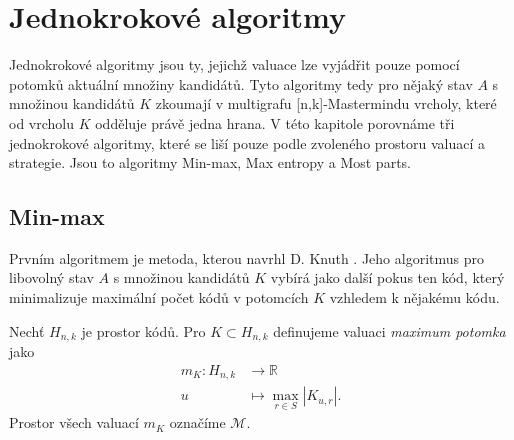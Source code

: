 
\chapter{Jednokrokové algoritmy}
Jednokrokové algoritmy jsou ty, jejichž valuace lze vyjádřit pouze pomocí potomků aktuální množiny kandidátů. Tyto algoritmy tedy pro nějaký stav $A$ s množinou kandidátů $K$ zkoumají v multigrafu [n,k]-Mastermindu vrcholy, které od vrcholu $K$ odděluje právě jedna hrana. V této kapitole porovnáme tři jednokrokové algoritmy, které se liší pouze podle zvoleného prostoru valuací a strategie. Jsou to algoritmy Min-max, Max entropy a Most parts. 







\section{Min-max}
Prvním algoritmem je metoda, kterou navrhl D. Knuth \cite{donald_e__knuth_1977}. Jeho algoritmus pro libovolný stav $A$ s množinou kandidátů $K$ vybírá jako další pokus ten kód, který minimalizuje maximální počet kódů v potomcích $K$ vzhledem k nějakému kódu. 
\begin{definice}
    Nechť $H_{n,k}$ je prostor kódů. Pro $K \subset H_{n,k}$ definujeme valuaci \emph{maximum potomka} jako
    \begin{align*}
        m_K \colon H_{n,k} &\to \mathbb{R} \\
        u &\mapsto \max_{r\in S} |K_{u,r}|.
    \end{align*}
    Prostor všech valuací $m_K$ označíme $\mathcal{M}$. 
\end{definice}

